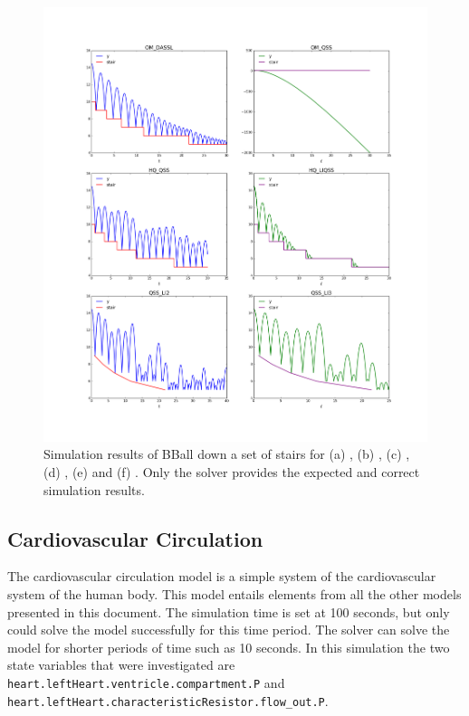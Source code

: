 \documentclass[10pt]{article}
\begin{document}
    \begin{figure}[htbp]
\begin{center}
\includegraphics[scale=0.4, clip,trim={45mm 40mm 30mm 40mm}]{./Figures/Model4.png}
\end{center}
\vspace{-0.5cm}
\caption{Simulation results of BBall down a set of stairs for (a) {}, (b) {}, (c) {}, (d) {},  (e) {} and (f) {}. Only the {} solver provides the expected and correct simulation results.}\label{Fig42}
\end{figure}

\newpage

\subsection{Cardiovascular Circulation}

The cardiovascular circulation model is a simple system of the cardiovascular system of the human body. This model entails elements from all the other models presented in this document. The simulation time is set at 100 seconds, but only {} could solve the model successfully for this time period. The {} solver can solve the model for shorter periods of time such as 10 seconds. In this simulation the two state variables that were investigated are {\tt{heart.leftHeart.ventricle.compartment.P}} and {\tt{heart.leftHeart.characteristicResistor.flow\_out.P}}.
\end{document}
